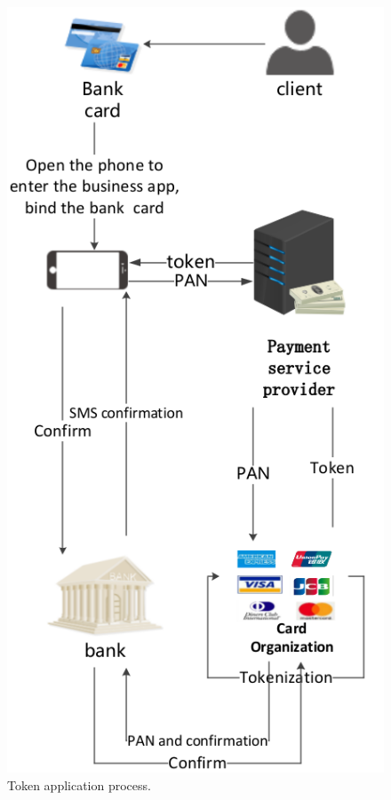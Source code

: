 \documentclass[journal]{IEEEtran}
\begin{document}
\begin{figure}[htbp]
\centerline{\includegraphics[scale=0.5]{tsp1.png}}
\caption{Token application process.}
\label{fig}
\end{figure}
\end{document}
